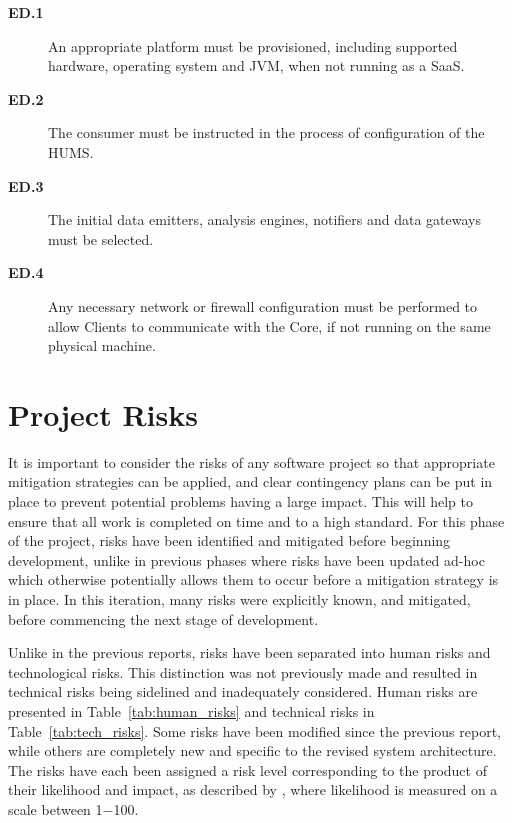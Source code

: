 \documentclass[10pt,a4paper]{article}
\newcommand{\ed}[1]{\textcolor{reqColor}{\textbf{ED.#1}}}
\begin{document}
 \begin{description}
 \item[\ed{1}] An appropriate platform must be provisioned, including supported hardware, operating system and JVM, when not running as a SaaS.
 \item[\ed{2}] The consumer must be instructed in the process of configuration of the HUMS.
 \item[\ed{3}] The initial data emitters, analysis engines, notifiers and data gateways must be selected.
 \item[\ed{4}] Any necessary network or firewall configuration must be performed to allow Clients to communicate with the Core, if not running on the same physical machine.
 \end{description}


\section{Project Risks}
\label{sec:risks}
It is important to consider the risks of any software project so that appropriate mitigation strategies can be applied, and clear contingency plans can be put in place to prevent potential problems having a large impact. This will help to ensure that all work is completed on time and to a high standard. For this phase of the project, risks have been identified and mitigated before beginning development, unlike in previous phases where risks have been updated ad-hoc which otherwise potentially allows them to occur before a mitigation strategy is in place. In this iteration, many risks were explicitly known, and mitigated, before commencing the next stage of development. 

Unlike in the previous reports, risks have been separated into human risks and technological risks. This distinction was not previously made and resulted in technical risks being sidelined and inadequately considered. Human risks are presented in Table~\ref{tab:human_risks} and technical risks in Table~\ref{tab:tech_risks}.
Some risks have been modified since the previous report, while others are completely new and specific to the revised system architecture. The risks have each been assigned a risk level corresponding to the product of their likelihood and impact, as described by \cite{risks}, where likelihood is measured on a scale between 1$-$100.
\end{document}
